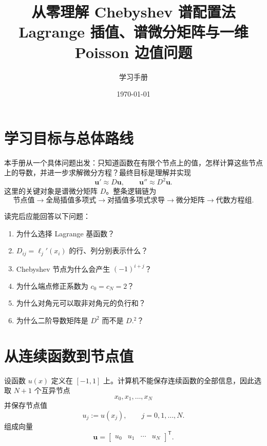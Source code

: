 \documentclass[11pt,a4paper]{ctexart}
\title{从零理解 Chebyshev 谱配置法\\
\large Lagrange 插值、谱微分矩阵与一维 Poisson 边值问题}
\author{学习手册}
\date{\today}
\numberwithin{equation}{section}
\newcommand{\vect}[1]{\bm{#1}}
\begin{document}
\maketitle
\tableofcontents
\newpage

\section{学习目标与总体路线}

本手册从一个具体问题出发：只知道函数在有限个节点上的值，怎样计算这些节点上的导数，并进一步求解微分方程？最终目标是理解并实现
\begin{equation}
  \vect{u}'\approx D\vect{u},
  \qquad
  \vect{u}''\approx D^2\vect{u}.
\end{equation}
这里的关键对象是谱微分矩阵 $D$。整条逻辑链为
\begin{equation*}
\text{节点值}
\longrightarrow \text{全局插值多项式}
\longrightarrow \text{对插值多项式求导}
\longrightarrow \text{微分矩阵}
\longrightarrow \text{代数方程组}.
\end{equation*}

读完后应能回答以下问题：
\begin{enumerate}[label=\arabic*.]
  \item 为什么选择 Lagrange 基函数？
  \item $D_{ij}=\ell_j'(x_i)$ 的行、列分别表示什么？
  \item Chebyshev 节点为什么会产生 $(-1)^{i+j}$？
  \item 为什么端点修正系数为 $c_0=c_N=2$？
  \item 为什么对角元可以取非对角元的负行和？
  \item 为什么二阶导数矩阵是 $D^2$ 而不是 $D.^2$？
\end{enumerate}

\section{从连续函数到节点值}

设函数 $u(x)$ 定义在 $[-1,1]$ 上。计算机不能保存连续函数的全部信息，因此选取 $N+1$ 个互异节点
\begin{equation}
  x_0,x_1,\ldots,x_N
\end{equation}
并保存节点值
\begin{equation}
  u_j:=u(x_j),\qquad j=0,1,\ldots,N.
\end{equation}
组成向量
\begin{equation}
  \vect{u}
  =\begin{bmatrix}u_0&u_1&\cdots&u_N\end{bmatrix}^{\mathsf T}.
\end{equation}
\end{document}
